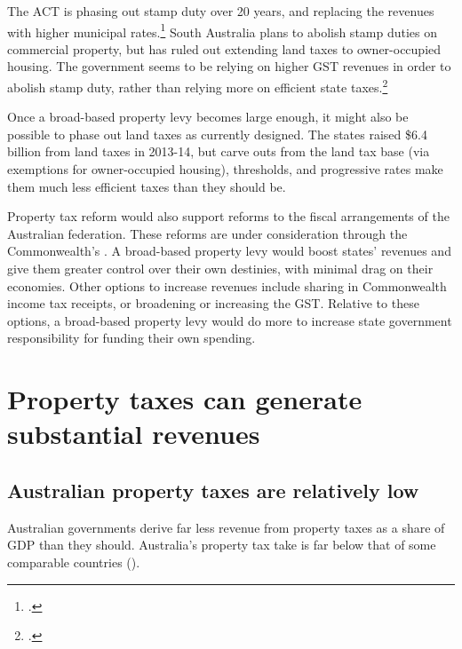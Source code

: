 The ACT is phasing out stamp duty over 20 years, and replacing the revenues with higher municipal rates.\footcites[][21]{ACT-Treasury2012-13-Budget-Papers}[][229]{ACT-Treasury2014-15-Budget-Papers}  South Australia plans to abolish stamp duties on commercial property, but has ruled out extending land taxes to owner-occupied housing. The government seems to be relying on higher GST revenues in order to abolish stamp duty, rather than relying more on efficient state taxes.\footcites{GovernmentSouthAustralia2015-Govt-response-to-State-Tax-Review}{DTF2015-State-Budget-Papers-201516} 

Once a broad-based property levy becomes large enough, it might also be possible to phase out land taxes as currently designed. The states raised \$6.4 billion from land taxes in 2013-14, but carve outs from the land tax base (via exemptions for owner-occupied housing), thresholds, and progressive rates make them much less efficient taxes than they should be. 

Property tax reform would also support reforms to the fiscal arrangements of the Australian federation. These reforms are under consideration through the Commonwealth’s 
.
A broad-based property levy would boost states’ revenues and give them greater control over their own destinies, with minimal drag on their economies. Other options to increase revenues include sharing in Commonwealth income tax receipts, or broadening or increasing the GST\@. Relative to these options, a broad-based property levy would do more to increase state government responsibility for funding their own spending. 


\chapter{Property taxes can generate substantial revenues}\label{chapter:PROP-3}
\section{Australian property taxes are relatively low}
Australian governments derive far less revenue from property taxes as a share of GDP than they should. Australia’s property tax take is far below that of some comparable countries ().

